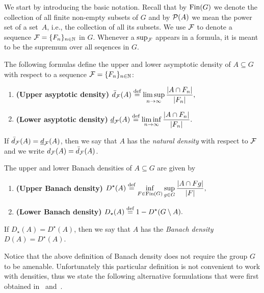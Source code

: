 We start by introducing the basic notation. Recall that by $\operatorname{Fin}(G)$ we denote the collection of all finite non-empty subsets of $G$ and by $\operatorname{\mathcal{P}}(A)$ we mean the power set of a set~$A$, i.e., the collection of all its subsets. We use $\operatorname{\mathcal{F}}$ to denote a \Folner sequence $\operatorname{\mathcal{F}} = \{F_n\}_{n\in \mathbb{N}}$ in $G$. 
%
Whenever a $\sup_{\operatorname{\mathcal{F}}}$ appears in a formula, it is meant to be the supremum over all \Folner seqences in $G$. 
%
\begin{defn}
The following formulas define the upper and lower asymptotic density of  $A\subseteq G$  with respect to a \Folner sequence $\operatorname{\mathcal{F}}=\{F_n\}_{n\in\mathbb{N}}$:
\begin{enumerate}
\item {\bf (Upper asyptotic density)} \hspace{5mm} $\displaystyle\bar{d}_{\operatorname{\mathcal{F}}}(A)\stackrel{\textup{def}}{=} \limsup_{n\to\infty}\frac{|A\cap F_n|}{|F_n|},$
\item {\bf (Lower asyptotic density)} \hspace{5.7mm}  $\displaystyle \underline d_{\operatorname{\mathcal{F}}}(A)\stackrel{\textup{def}}{=} \liminf_{n\to\infty}\frac{|A\cap F_n|}{|F_n|}. $
\end{enumerate}
If $\bar{d}_{\operatorname{\mathcal{F}}}(A)=\underline d_{\operatorname{\mathcal{F}}}(A)$, then we say that $A$ has the \emph{natural density} with respect to $\operatorname{\mathcal{F}}$ and we write $ d_{\operatorname{\mathcal{F}}}(A)=\bar{d}_{\operatorname{\mathcal{F}}}(A)$.

The upper and lower Banach densities of $A\subseteq G$ are given by
\begin{enumerate}
\item {\bf (Upper Banach density)} \hspace{5mm} $\displaystyle D^\star(A)\stackrel{\textup{def}}{=} \inf_{F\in\operatorname{Fin}(G)}\sup_{g\in G}\frac{|A\cap Fg|}{|F|},$
\item {\bf (Lower Banach density)} \hspace{5.7mm}  $\displaystyle D_\star(A)\stackrel{\textup{def}}{=} 1-D^\star(G\setminus A). $
\end{enumerate}
If $D_\star(A)=D^\star(A)$, then we say that $A$ has the \emph{Banach density} $D(A)=D^\star(A)$.
\end{defn}

\noindent
Notice that the above definition of Banach density does not require the group $G$ to be amenable.
%
Unfortunately this particular definition is not convenient to work with densities, thus we state the following alternative formulations that were first obtained in~\cite{DHZ16} and~\cite{BBF10}.


